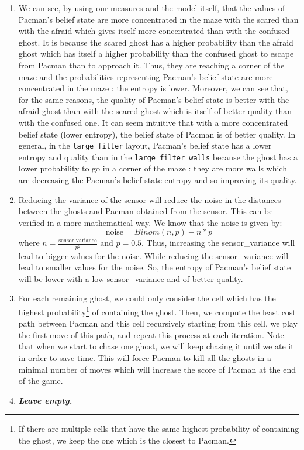 \documentclass{article}
\begin{document}
\begin{enumerate}[label=\alph*.,leftmargin=*]
    \item We can see, by using our measures and the model itself, that the values of Pacman's belief state are more concentrated in the maze with the scared than with the afraid which gives itself more concentrated than with the confused ghost. It is because the scared ghost has a higher probability than the afraid ghost which has itself a higher probability than the confused ghost to escape from Pacman than to approach it. Thus, they are reaching a corner of the maze and the probabilities representing Pacman's belief state are more concentrated in the maze : the entropy is lower.
    Moreover, we can see that, for the same reasons, the quality of Pacman's belief state is better with the afraid ghost than with the scared ghost which is itself of better quality than with the confused one. It can seem intuitive that with a more concentrated belief state (lower entropy), the belief state of Pacman is of better quality. In general, in the \texttt{large\_filter} layout, Pacman's belief state has a lower entropy and quality than in the \texttt{large\_filter\_walls} because the ghost has a lower probability to go in a corner of the maze : they are more walls which are decreasing the Pacman's belief state entropy and so improving its quality.
    \item Reducing the variance of the sensor will reduce the noise in the distances between the ghosts and Pacman obtained from the sensor. This can be verified in a more mathematical way. We know that the noise is given by: $$\text{noise} = Binom(n, p) - n * p$$
    where $n = \frac{\text{sensor\_variance}}{p^2}$ and $p = 0.5$. Thus, increasing the sensor\_variance will lead to bigger values for the noise. While reducing the sensor\_variance will lead to smaller values for the noise. So, the entropy of Pacman's belief state will be lower with a low sensor\_variance and of better quality.
    
    \item For each remaining ghost, we could only consider the cell which has the highest probability\footnote{If there are multiple cells that have the same highest probability of containing the ghost, we keep the one which is the closest to Pacman.} of containing the ghost. Then, we compute the least cost path between Pacman and this cell recursively starting from this cell, we play the first move of this path, and repeat this process at each iteration. Note that when we start to chase one ghost, we will keep chasing it until we ate it in order to save time. This will force Pacman to kill all the ghosts in a minimal number of moves which will increase the score of Pacman at the end of the game.
    \item \textbf{\textit{Leave empty.}}
\end{enumerate}

\end{document}
